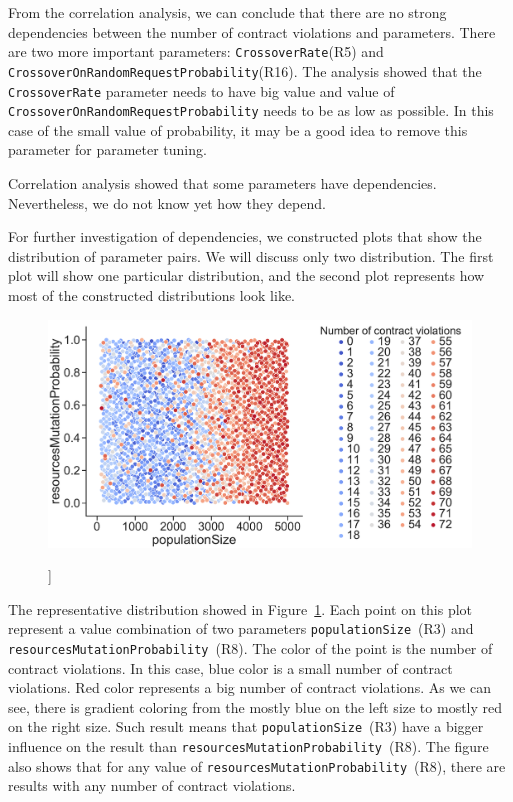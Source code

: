From the correlation analysis, we can conclude that there are no strong dependencies between the number of contract violations and parameters. There are two more important parameters: \texttt{CrossoverRate}(R5) and \texttt{Cross\-ov\-er\-On\-Ran\-dom\-Re\-qu\-est\-Pro\-ba\-bi\-li\-ty}(R16).
The analysis showed that the \texttt{CrossoverRate} parameter needs to have big value and value of \texttt{Cross\-ov\-er\-On\-Ran\-dom\-Re\-qu\-est\-Pro\-ba\-bi\-li\-ty} needs to be as low as possible. In this case of the small value of probability, it may be a good idea to remove this parameter for parameter tuning.

Correlation analysis showed that some parameters have dependencies. Nevertheless, we do not know yet how they depend.

For further investigation of dependencies, we constructed plots that show the distribution of parameter pairs. We will discuss only two distribution. The first plot will show one particular distribution, and the second plot represents how most of the constructed distributions look like.

\begin{figure}
	\centering
	\includegraphics[width=\textwidth]{images/populatioSizeVsResMutationProbability.pdf}
	\caption[]]{}
	\label{fig:populatioSizeVsResMutationProbability}
\end{figure}

The representative distribution showed in Figure~\ref{fig:populatioSizeVsResMutationProbability}. Each point on this plot represent a value combination of two parameters \texttt{populationSize}~(R3) and \texttt{re\-so\-ur\-ces\-Mu\-ta\-ti\-on\-Pro\-ba\-bi\-li\-ty}~(R8). The color of the point is the number of contract violations. In this case, blue color is a small number of contract violations. Red color represents a big number of contract violations. As we can see, there is gradient coloring from the mostly blue on the left size to mostly red on the right size. Such result means that \texttt{po\-pu\-la\-ti\-on\-Si\-ze}~(R3) have a bigger influence on the result than \texttt{re\-so\-ur\-ces\-Mu\-ta\-ti\-on\-Pro\-ba\-bi\-li\-ty}~(R8). The figure also shows that for any value of \texttt{re\-so\-ur\-ces\-Mu\-ta\-ti\-on\-Pro\-ba\-bi\-li\-ty}~(R8), there are results with any number of contract violations.

